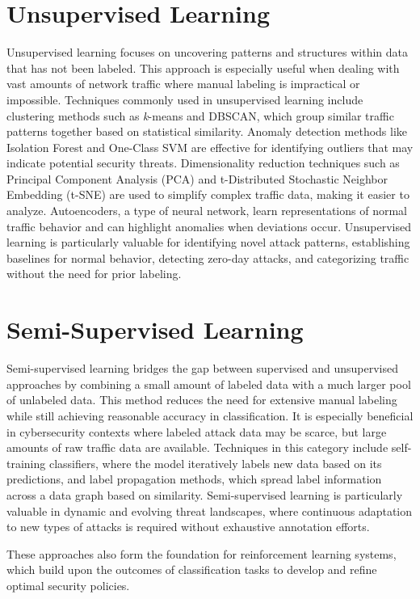 \documentclass{report}
\begin{document}
\section*{Unsupervised Learning}

Unsupervised learning focuses on uncovering patterns and structures within data that has not been labeled. This approach is especially useful when dealing with vast amounts of network traffic where manual labeling is impractical or impossible. Techniques commonly used in unsupervised learning include clustering methods such as \textit{k}-means and DBSCAN, which group similar traffic patterns together based on statistical similarity. Anomaly detection methods like Isolation Forest and One-Class SVM are effective for identifying outliers that may indicate potential security threats. Dimensionality reduction techniques such as Principal Component Analysis (PCA) and t-Distributed Stochastic Neighbor Embedding (t-SNE) are used to simplify complex traffic data, making it easier to analyze. Autoencoders, a type of neural network, learn representations of normal traffic behavior and can highlight anomalies when deviations occur. Unsupervised learning is particularly valuable for identifying novel attack patterns, establishing baselines for normal behavior, detecting zero-day attacks, and categorizing traffic without the need for prior labeling.

\section*{Semi-Supervised Learning}

Semi-supervised learning bridges the gap between supervised and unsupervised approaches by combining a small amount of labeled data with a much larger pool of unlabeled data. This method reduces the need for extensive manual labeling while still achieving reasonable accuracy in classification. It is especially beneficial in cybersecurity contexts where labeled attack data may be scarce, but large amounts of raw traffic data are available. Techniques in this category include self-training classifiers, where the model iteratively labels new data based on its predictions, and label propagation methods, which spread label information across a data graph based on similarity. Semi-supervised learning is particularly valuable in dynamic and evolving threat landscapes, where continuous adaptation to new types of attacks is required without exhaustive annotation efforts.

\vspace{1em}
These approaches also form the foundation for reinforcement learning systems, which build upon the outcomes of classification tasks to develop and refine optimal security policies.
\end{document}
